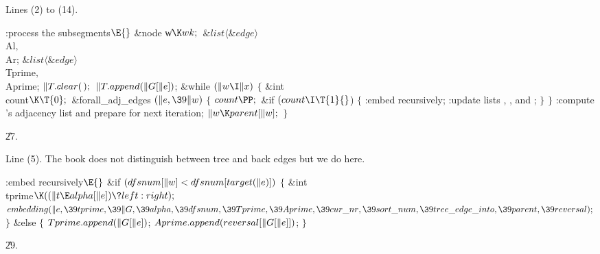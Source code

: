 Lines (2) to (14).

\Y\B\4:process the subsegments\X${}\E{}$\6
\&{node} \|w${}\K\\{wk};{}$\6
${}\&{list}\langle\&{edge}\rangle{}$ \\{Al}${},{}$ \\{Ar};\6
${}\&{list}\langle\&{edge}\rangle{}$ \\{Tprime}${},{}$ \\{Aprime};\7
${}\|T.\\{clear}(\,);{}$\6
${}\|T.\\{append}(\|G[\|e]){}$;\6
\&{while} ${}(\|w\I\|x){}$\5
${}\{{}$\1\6
\&{int} \\{count}${}\K\T{0};{}$\7
\&{forall\_adj\_edges} ${}(\|e,\39\|w){}$\5
${}\{{}$\1\6
${}\\{count}\PP;{}$\6
\&{if} ${}(\\{count}\I\T{1}{}$)\6
${}\{{}$\1\6
:embed recursively\X;\6
:update lists , , and \X;\6
\4${}\}{}$\2\6
\4${}\}{}$\2\6
:compute 's adjacency list and prepare for next iteration\X;\6
${}\|w\K\\{parent}[\|w];{}$\6
\4${}\}{}$\2\par
\U27.\fi

Line (5). The book does not distinguish between tree and back edges but
we do
here.

\Y\B\4:embed recursively\X${}\E{}$\6
\&{if} ${}(\\{dfsnum}[\|w]<\\{dfsnum}[\\{target}(\|e)]){}$\5
${}\{{}$\1\6
\&{int} \\{tprime}${}\K((\|t\E\\{alpha}[\|e])\?\\{left}:\\{right});{}$\7
${}\\{embedding}(\|e,\39\\{tprime},\39\|G,\39\\{alpha},\39\\{dfsnum},\39%
\\{Tprime},\39\\{Aprime},\39\\{cur\_nr},\39\\{sort\_num},\39\\{tree\_edge%
\_into},\39\\{parent},\39\\{reversal});{}$\6
\4${}\}{}$\2\6
\&{else}\5
${}\{{}$\1\6
${}\\{Tprime}.\\{append}(\|G[\|e]){}$;\6
${}\\{Aprime}.\\{append}(\\{reversal}[\|G[\|e]]){}$;\6
\4${}\}{}$\2\par
\U29.\fi

